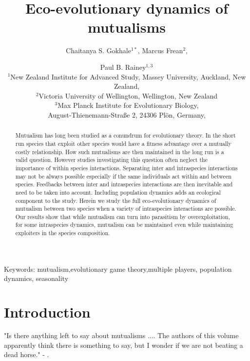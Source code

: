 \documentclass[12pt]{article}
\title{\vspace*{-22mm}\bf Eco-evolutionary dynamics of mutualisms}
\author{Chaitanya S. Gokhale$^{1*}$,
Marcus Frean$^{2}$,
 \and Paul B. Rainey$^{1,3}$ \\
\normalsize $^{1}$New Zealand Institute for Advanced Study, Massey University, Auckland, New Zealand, \\
\normalsize $^2$Victoria University of Wellington, Wellington, New Zealand\\
\normalsize $^3$Max Planck Institute for Evolutionary Biology, \\
\normalsize August-Thienemann-Stra{\ss}e 2, 24306 Pl\"{o}n, Germany,\\
}
\date{}
\begin{document}
\linenumbers
\maketitle

\begin{abstract}
Mutualism has long been studied as a conundrum for evolutionary theory.
In the short run species that exploit other species would have a fitness advantage over a mutually costly relationship.
How such mutualisms are then maintained in the long run is a valid question.
However studies investigating this question often neglect the importance of within species interactions.
Separating inter and intraspecies interactions may not be always possible especially if the same individuals act within and between species.
Feedbacks between inter and intraspecies interactions are then inevitable and need to be taken into account.
Including population dynamics adds an ecological component to the study.
Herein we study the full eco-evolutionary dynamics of mutualism between two species when a variety of  intraspecies interactions are possible.
Our results show that while mutualism can turn into parasitism by overexploitation, for some intraspecies dynamics, mutualism can be maintained even while maintaining exploiters in the species composition.
\end{abstract}

\noindent
Keywords: mutualism,evolutionary game theory,multiple players, population dynamics, seasonality

\tableofcontents

\section{Introduction}

"Is there anything left to say about mutualisms .... The authors of this volume apparently think there is something to say, but I wonder if we are not beating a dead horse." 
- \cite{janzen:bookchapter:1985}.
\end{document}
